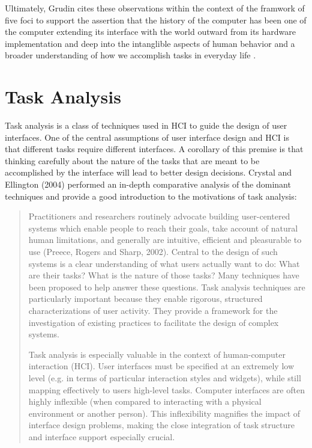 Ultimately, Grudin cites these observations within the context of the framwork of five foci to support the assertion that the history of the computer has been one of the computer extending its interface with the world outward from its hardware implementation and deep into the intanglible aspects of human behavior and a broader understanding of how we accomplish tasks in everyday life \cite{continuity1990}.

\section{Task Analysis}

Task analysis is a class of techniques used in HCI to guide the design of user interfaces. One of the central assumptions of user interface design and HCI is that different tasks require different interfaces. A corollary of this premise is that thinking carefully about the nature of the tasks that are meant to be accomplished by the interface will lead to better design decisions. Crystal and Ellington (2004) performed an in-depth comparative analysis of the dominant techniques and provide a good introduction to the motivations of task analysis:

\begin{quote}
Practitioners and researchers routinely advocate building user-centered systems which enable people to reach their goals, take account of natural human limitations, and generally are intuitive, efficient and pleasurable to use (Preece, Rogers and Sharp, 2002). Central to the design of such systems is a clear understanding of what users actually want to do: What are their tasks? What is the nature of those tasks? Many techniques have been proposed to help answer these questions. Task analysis techniques are particularly important because they enable rigorous, structured characterizations of user activity. They provide a framework for the investigation of existing practices to facilitate the design of complex systems.

Task analysis is especially valuable in the context of human-computer interaction (HCI). User interfaces must be specified at an extremely low level (e.g. in terms of particular interaction styles and widgets), while still mapping effectively to users high-level tasks. Computer interfaces are often highly inflexible (when compared to interacting with a physical environment or another person). This inflexibility magnifies the impact of interface design problems, making the close integration of task structure and interface support especially crucial. \cite{crystal2004}
\end{quote}

